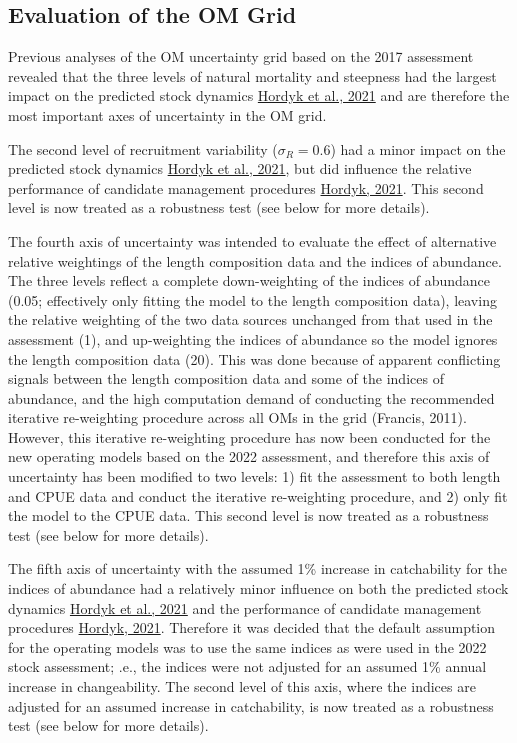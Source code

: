 \documentclass[
]{article}
\begin{document}
\hypertarget{evaluation-of-the-om-grid}{%
\subsection{Evaluation of the OM Grid}\label{evaluation-of-the-om-grid}}

Previous analyses of the OM uncertainty grid based on the 2017 assessment revealed that the three levels of natural mortality and steepness had the largest impact on the predicted stock dynamics \href{https://iccat.github.io/nswo-mse/SCRS_Papers//Hordyk_et_al_SCRS_2021_099.pdf}{Hordyk et al., 2021} and are therefore the most important axes of uncertainty in the OM grid.

The second level of recruitment variability (\(\sigma_R = 0.6\)) had a minor impact on the predicted stock dynamics \href{https://iccat.github.io/nswo-mse/SCRS_Papers//Hordyk_et_al_SCRS_2021_099.pdf}{Hordyk et al., 2021}, but did influence the relative performance of candidate management procedures \href{https://iccat.github.io/nswo-mse/SCRS_Papers//Hordyk_SCRS_2021_161.pdf}{Hordyk, 2021}. This second level is now treated as a robustness test (see below for more details).

The fourth axis of uncertainty was intended to evaluate the effect of alternative relative weightings of the length composition data and the indices of abundance. The three levels reflect a complete down-weighting of the indices of abundance (0.05; effectively only fitting the model to the length composition data), leaving the relative weighting of the two data sources unchanged from that used in the assessment (1), and up-weighting the indices of abundance so the model ignores the length composition data (20). This was done because of apparent conflicting signals between the length composition data and some of the indices of abundance, and the high computation demand of conducting the recommended iterative re-weighting procedure across all OMs in the grid (Francis, 2011). However, this iterative re-weighting procedure has now been conducted for the new operating models based on the 2022 assessment, and therefore this axis of uncertainty has been modified to two levels: 1) fit the assessment to both length and CPUE data and conduct the iterative re-weighting procedure, and 2) only fit the model to the CPUE data. This second level is now treated as a robustness test (see below for more details).

The fifth axis of uncertainty with the assumed 1\% increase in catchability for the indices of abundance had a relatively minor influence on both the predicted stock dynamics \href{https://iccat.github.io/nswo-mse/SCRS_Papers//Hordyk_et_al_SCRS_2021_099.pdf}{Hordyk et al., 2021} and the performance of candidate management procedures \href{https://iccat.github.io/nswo-mse/SCRS_Papers//Hordyk_SCRS_2021_161.pdf}{Hordyk, 2021}. Therefore it was decided that the default assumption for the operating models was to use the same indices as were used in the 2022 stock assessment; .e., the indices were not adjusted for an assumed 1\% annual increase in changeability. The second level of this axis, where the indices are adjusted for an assumed increase in catchability, is now treated as a robustness test (see below for more details).
\end{document}

